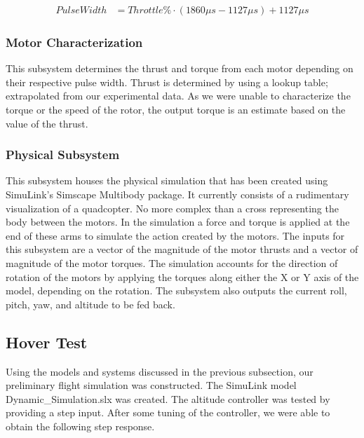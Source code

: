 \begin{align*}
	PulseWidth &= Throttle\% \cdot (1860 \mu s - 1127 \mu s) + 1127 \mu s 
\end{align*}

\subsubsection{Motor Characterization}
This subsystem determines the thrust and torque from each motor depending on their respective pulse width.  Thrust is determined by using a lookup table; extrapolated from our experimental data.  As we were unable to characterize the torque or the speed of the rotor, the output torque is an estimate based on the value of the thrust.

\subsubsection{Physical Subsystem}
This subsystem houses the physical simulation that has been created using SimuLink's Simscape Multibody package.  It currently consists of a rudimentary visualization of a quadcopter.  No more complex than a cross representing the body between the motors.  In the simulation a force and torque is applied at the end of these arms to simulate the action created by the motors.  
The inputs for this subsystem are a vector of the magnitude of the motor thrusts and a vector of magnitude of the motor torques.  The simulation accounts for the direction of rotation of the motors by applying the torques along either the X or Y axis of the model, depending on the rotation.  The subsystem also outputs the current roll, pitch, yaw, and altitude to be fed back.

\subsection{Hover Test}
Using the models and systems discussed in the previous subsection, our preliminary flight simulation was constructed.  The SimuLink model Dynamic\_Simulation.slx was created.  The altitude controller was tested by providing a step input.  After some tuning of the controller, we were able to obtain the following step response.

